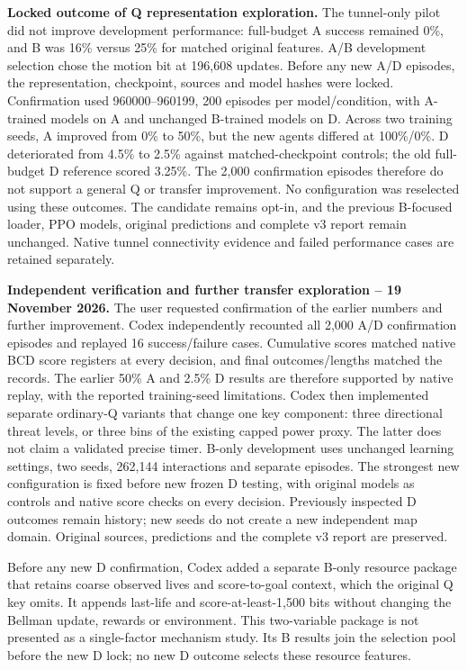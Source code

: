 \medskip
\noindent\textbf{Locked outcome of Q representation exploration.}
The tunnel-only pilot did not improve development performance: full-budget
A success remained 0\%, and B was 16\% versus 25\% for matched original
features. A/B development selection chose the motion bit at 196,608 updates.
Before any new A/D episodes, the representation, checkpoint, sources and model
hashes were locked. Confirmation used 960000--960199, 200 episodes per
model/condition, with A-trained models on A and unchanged B-trained models
on D. Across two training seeds, A improved from 0\% to 50\%, but the new
agents differed at 100\%/0\%. D deteriorated from 4.5\% to 2.5\% against
matched-checkpoint controls; the old full-budget D reference scored 3.25\%.
The 2,000 confirmation episodes therefore do not support a general Q or
transfer improvement. No configuration was reselected using these outcomes.
The candidate remains opt-in, and the previous B-focused loader, PPO models,
original predictions and complete v3 report remain unchanged. Native tunnel
connectivity evidence and failed performance cases are retained separately.

\medskip
\noindent\textbf{Independent verification and further transfer exploration -- 19 November 2026.}
The user requested confirmation of the earlier numbers and further improvement.
Codex independently recounted all 2,000 A/D confirmation episodes and replayed
16 success/failure cases. Cumulative scores matched native BCD score registers
at every decision, and final outcomes/lengths matched the records. The earlier
50\% A and 2.5\% D results are therefore supported by native replay, with the
reported training-seed limitations. Codex then implemented separate ordinary-Q
variants that change one key component: three directional threat levels, or
three bins of the existing capped power proxy. The latter does not claim a
validated precise timer. B-only development uses unchanged learning settings,
two seeds, 262,144 interactions and separate episodes. The strongest new
configuration is fixed before new frozen D testing, with original models as
controls and native score checks on every decision. Previously inspected D
outcomes remain history; new seeds do not create a new independent map domain.
Original sources, predictions and the complete v3 report are preserved.

Before any new D confirmation, Codex added a separate B-only resource package
that retains coarse observed lives and score-to-goal context, which the original
Q key omits. It appends last-life and score-at-least-1,500 bits without changing
the Bellman update, rewards or environment. This two-variable package is not
presented as a single-factor mechanism study. Its B results join the selection
pool before the new D lock; no new D outcome selects these resource features.

